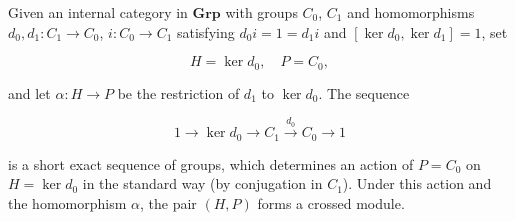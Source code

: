 Given an internal category in $\mathbf{Grp}$ with groups $C_0$, $C_1$ and homomorphisms $d_0, d_1 : C_1 \rightarrow C_0$, $i : C_0 \rightarrow C_1$ satisfying $d_0 i = 1 = d_1 i$ and $[\ker d_0, \ker d_1] = 1$, set

$$H = \ker d_0, \quad P = C_0,$$

and let $\alpha : H \rightarrow P$ be the restriction of $d_1$ to $\ker d_0$. The sequence

$$1 \longrightarrow \ker d_0 \longrightarrow C_1 \xrightarrow{d_0} C_0 \longrightarrow 1$$

is a short exact sequence of groups, which determines an action of $P = C_0$ on $H = \ker d_0$ in the standard way (by conjugation in $C_1$). Under this action and the homomorphism $\alpha$, the pair $(H, P)$ forms a crossed module.
